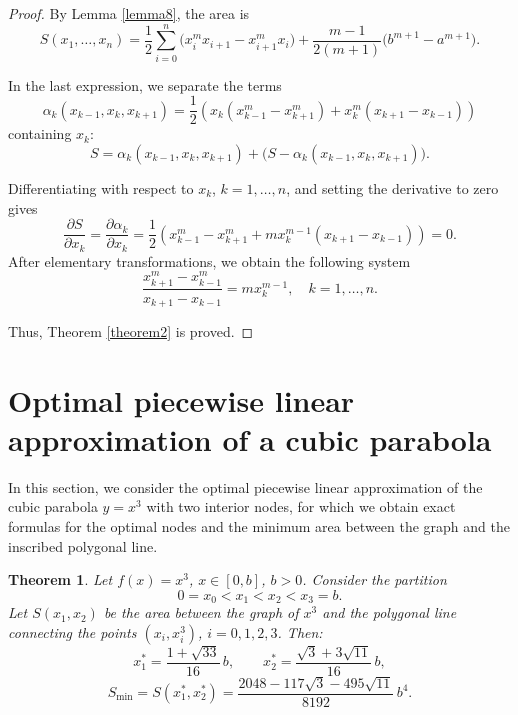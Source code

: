 \documentclass[amstex,16pt, amssymb]{article}
\theoremstyle{plain}
\newtheorem{theorem}{Theorem}[section]
\theoremstyle{definition}
\numberwithin{equation}{section}
\numberwithin{equation}{section}
\begin{document}
\begin{proof} 
By Lemma \ref{lemma8}, the area is
\[
S(x_1, \dots, x_n) =
\frac{1}{2} \sum_{i=0}^{n} \bigl( x_i^m x_{i+1} - x_{i+1}^m x_i \bigr)
+ \frac{m-1}{2(m+1)} \bigl( b^{m+1} - a^{m+1} \bigr).
\]



In the last expression, we separate the terms $$\alpha_k(x_{k-1},x_k, x_{k+1})=\frac{1}{2}\left(x_k(x^m_{k-1}-x^m_{k+1})+x^m_k(x_{k+1}-x_{k-1})\right)$$ containing $x_k$:
$$
S=\alpha_k(x_{k-1},x_k, x_{k+1})+ \bigl(S-\alpha_k(x_{k-1},x_k, x_{k+1})\bigr).
$$

Differentiating with respect to \(x_k\), \(k=1,\dots,n\), and setting the derivative to zero gives
\[
\frac{\partial S}{\partial x_k}=\frac{\partial \alpha_k }{\partial x_k}=   \frac{1}{2}\left(x^m_{k-1}-x^m_{k+1}+mx^{m-1}_k(x_{k+1}-x_{k-1})\right)
=0.
\]
After elementary transformations, we obtain the following system
\[
\frac{x_{k+1}^m-x_{k-1}^m}{x_{k+1}-x_{k-1}}=m x_k^{m-1},\quad k=1,\dots,n.
\]


Thus, Theorem \ref{theorem2} is proved.
\end{proof}

\section{ Optimal piecewise linear approximation of a cubic parabola}

In this section, we consider the optimal piecewise linear approximation of the cubic parabola $y=x^3$  with two interior nodes, for which we obtain exact formulas for the optimal nodes and the minimum area between the graph and the inscribed polygonal line.













\begin{theorem}\label{theorem3}
Let \(f(x)=x^3\), \(x\in[0,b]\), \(b>0\). Consider the partition
\[
0=x_0<x_1<x_2<x_3=b.
\]
Let \(S(x_1,x_2)\) be the area between the graph of \(x^3\) and the polygonal line connec\-ting the points \((x_i,x_i^3)\), \(i=0,1,2,3\). Then:
\[
x_1^*=\frac{1+\sqrt{33}}{16}\,b,\qquad
x_2^*=\frac{\sqrt{3}+3\sqrt{11}}{16}\,b,
\]
\[
S_{\min}=S(x_1^*,x_2^*)=
\frac{2048-117\sqrt{3}-495\sqrt{11}}{8192}\,b^4.
\]
\end{theorem}
\end{document}
